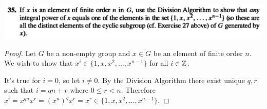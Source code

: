 ~\\~\\
\begin{mdframed}
\includegraphics[width=400pt]{img/algebra--nf--1--problem-set-1-7561.png}
\end{mdframed}

\begin{proof}
  Let $G$ be a non-empty group and $x \in G$ be an element of finite order $n$. We wish to show
  that $x^i \in \{1, x, x^2, \ldots, x^{n-1}\}$ for all $i \in \mathbb{Z}$.

  It's true for $i = 0$, so let $i \neq 0$. By the Division Algorithm there exist unique $q, r$ such
  that $i = qn + r$ where $0 \leq r < n$.
  Therefore $x^i = x^{qn}x^r = (x^n)^qx^r = x^r \in \{1, x, x^2, \ldots, x^{n-1}\}$.
\end{proof}
